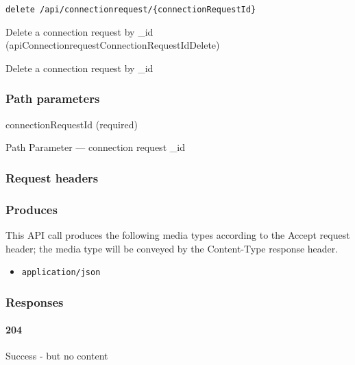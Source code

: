 \protect\hypertarget{apiConnectionrequestConnectionRequestIdDelete}{}{}

\begin{verbatim}
delete /api/connectionrequest/{connectionRequestId}
\end{verbatim}

Delete a connection request by \_id
({apiConnectionrequestConnectionRequestIdDelete})

Delete a connection request by \_id

\hypertarget{path-parameters-27}{%
\subsubsection{Path parameters}\label{path-parameters-27}}

connectionRequestId (required)

{Path Parameter} --- connection request \_id

\hypertarget{request-headers-28}{%
\subsubsection{Request headers}\label{request-headers-28}}

\hypertarget{produces-52}{%
\subsubsection{Produces}\label{produces-52}}

This API call produces the following media types according to the
{Accept} request header; the media type will be conveyed by the
{Content-Type} response header.

\begin{itemize}
\tightlist
\item
  \texttt{application/json}
\end{itemize}

\hypertarget{responses-52}{%
\subsubsection{Responses}\label{responses-52}}

\hypertarget{section-171}{%
\paragraph{204}\label{section-171}}

Success - but no content \protect\hyperlink{}{}

